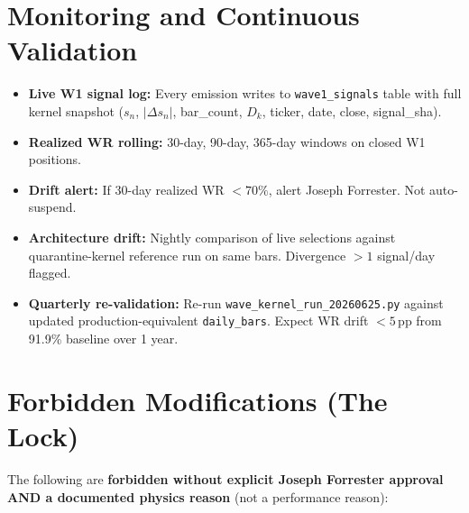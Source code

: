 \documentclass[11pt,a4paper]{article}
\begin{document}
\section{Monitoring and Continuous Validation}

\begin{itemize}
  \item \textbf{Live W1 signal log:} Every emission writes to \texttt{wave1\_signals} table with full kernel snapshot ($s_n$, $|\Delta s_n|$, bar\_count, $D_k$, ticker, date, close, signal\_sha).
  \item \textbf{Realized WR rolling:} 30-day, 90-day, 365-day windows on closed W1 positions.
  \item \textbf{Drift alert:} If 30-day realized WR $< 70\%$, alert Joseph Forrester. Not auto-suspend.
  \item \textbf{Architecture drift:} Nightly comparison of live selections against quarantine-kernel reference run on same bars. Divergence $> 1$ signal/day flagged.
  \item \textbf{Quarterly re-validation:} Re-run \texttt{wave\_kernel\_run\_20260625.py} against updated production-equivalent \texttt{daily\_bars}. Expect WR drift $< 5$\,pp from 91.9\% baseline over 1 year.
\end{itemize}

\section{Forbidden Modifications (The Lock)}

The following are \textbf{forbidden without explicit Joseph Forrester approval AND a documented physics reason} (not a performance reason):
\end{document}
